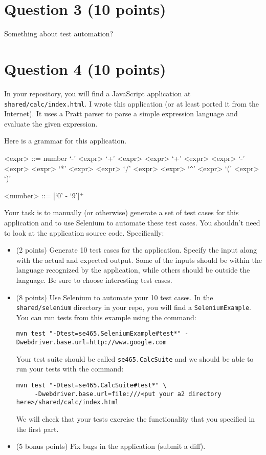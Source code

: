 \documentclass[10pt,hidelinks]{article}
\begin{document}
\section*{Question 3 (10 points)}

Something about test automation?

\section*{Question 4 (10 points)}

In your repository, you will find a JavaScript application at {\tt
  shared/calc/index.html}. I wrote this application (or at least
ported it from the Internet). It uses a Pratt parser to parse a simple expression language and evaluate the given expression.

Here is a grammar for this application.

\begin{grammar}
  <expr> ::= number 
         \alt `-' <expr>
         \alt `+' <expr>
         \alt  <expr> `+' <expr> \alt  <expr> `-' <expr>
         \alt  <expr> `*' <expr> \alt  <expr> `/' <expr>
         \alt  <expr> `\verb+^+' <expr>
         \alt `(' <expr> `)'
         
  <number> ::= [`0' - `9']$^+$
\end{grammar}


Your task is to manually (or otherwise) generate a set of test cases
for this application and to use Selenium to automate these test
cases. You shouldn't need to look at the application source
code. Specifically:

\begin{itemize}
\item (2 points) Generate 10 test cases for the application. Specify the input along with the actual and expected output. Some of the inputs should be within the language recognized by the application, while others should be outside the language. Be sure to choose interesting test cases.

\item (8 points) Use Selenium to automate your 10 test cases. In the {\tt shared/selenium} directory in your repo, you will find a {\tt SeleniumExample}. You can run tests from this example using the command:

\begin{verbatim}
mvn test "-Dtest=se465.SeleniumExample#test*" -Dwebdriver.base.url=http://www.google.com
\end{verbatim}

Your test suite should be called {\tt se465.CalcSuite} and we should be able to run your tests with the command:

\begin{verbatim}
mvn test "-Dtest=se465.CalcSuite#test*" \
     -Dwebdriver.base.url=file:///<put your a2 directory here>/shared/calc/index.html
\end{verbatim}

We will check that your tests exercise the functionality that you specified in the first part.

\item (5 bonus points) Fix bugs in the application (submit a diff).
\end{itemize}
\end{document}
